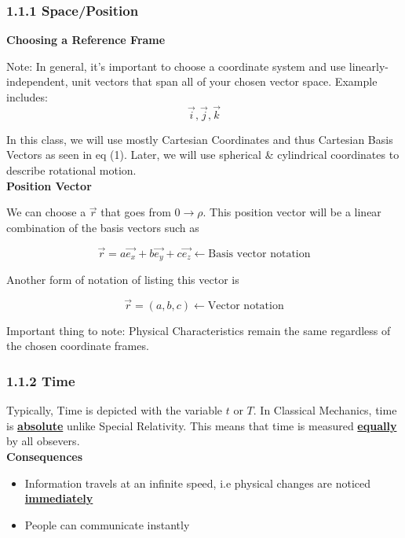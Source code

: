 \documentclass{article}
\newtheorem{one minute paper}[theorem]{One Minute Paper}
\begin{document}
\subsubsection*{1.1.1 Space/Position}

\textbf{Choosing a Reference Frame}

    Note: In general, it's important to choose a coordinate system and use linearly-independent, 
unit vectors that span all of your chosen vector space. Example includes:
\begin{equation}
    \vec{i}, \vec{j}, \vec{k}
\end{equation}

In this class, we will use mostly Cartesian Coordinates and thus Cartesian Basis Vectors as seen in eq (1). 
Later, we will use spherical \& cylindrical coordinates to describe rotational motion. \\

\textbf{Position Vector}

We can choose a $\vec{r}$ that goes from $0 \rightarrow \rho$. This position vector will be a linear combination of the basis vectors
such as

\begin{equation}
    \vec{r} = a\vec{e_x} + b\vec{e_y} + c\vec{e_z} \leftarrow \text{Basis vector notation}
\end{equation}

Another form of notation of listing this vector is 

\begin{equation}
    \vec{r} = (a,b,c) \leftarrow \text{Vector notation}
\end{equation}

Important thing to note: Physical Characteristics remain the same regardless of the chosen coordinate frames. 

\newpage

\subsubsection*{1.1.2 Time}

Typically, Time is depicted with the variable $t$ or $T$. In Classical Mechanics, time is \underline{\textbf{absolute}} unlike Special Relativity. This means that
time is measured \textbf{\underline{equally}} by all obsevers. \\

\textbf{Consequences}
\begin{itemize}
    \item Information travels at an infinite speed, i.e physical changes are noticed \textbf{\underline{immediately}}
    \item People can communicate instantly
\end{itemize}
\end{document}
